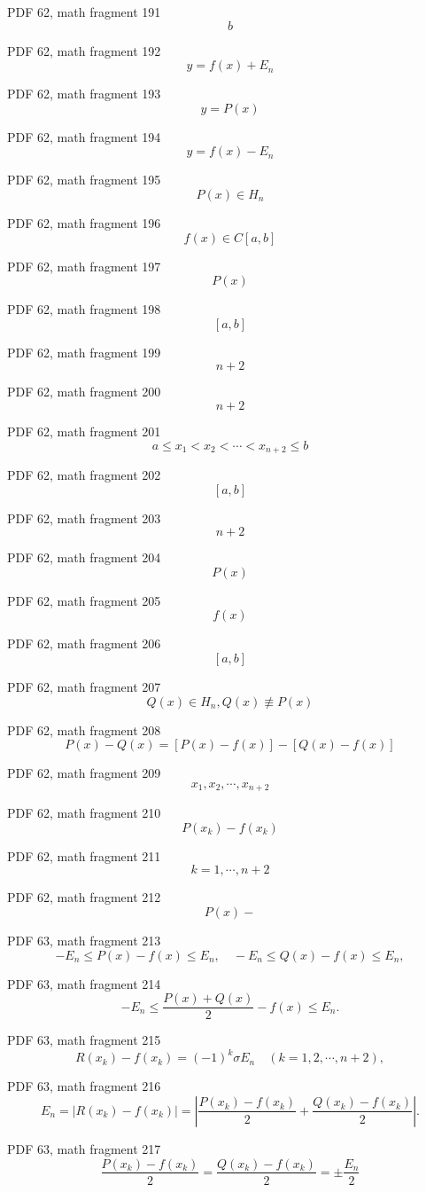 \documentclass[UTF8,fontset=fandol]{ctexart}
\begin{document}
PDF 62, math fragment 191
\[b\]
\par
PDF 62, math fragment 192
\[y=f(x)+E_n\]
\par
PDF 62, math fragment 193
\[y=P(x)\]
\par
PDF 62, math fragment 194
\[y=f(x)-E_n\]
\par
PDF 62, math fragment 195
\[P(x) \in H_n\]
\par
PDF 62, math fragment 196
\[f(x) \in C[a,b]\]
\par
PDF 62, math fragment 197
\[P(x)\]
\par
PDF 62, math fragment 198
\[[a,b]\]
\par
PDF 62, math fragment 199
\[n+2\]
\par
PDF 62, math fragment 200
\[n+2\]
\par
PDF 62, math fragment 201
\[a \leqslant x_1 < x_2 < \cdots < x_{n+2} \leqslant b\]
\par
PDF 62, math fragment 202
\[[a,b]\]
\par
PDF 62, math fragment 203
\[n+2\]
\par
PDF 62, math fragment 204
\[P(x)\]
\par
PDF 62, math fragment 205
\[f(x)\]
\par
PDF 62, math fragment 206
\[[a,b]\]
\par
PDF 62, math fragment 207
\[Q(x) \in H_n, Q(x) \not\equiv P(x)\]
\par
PDF 62, math fragment 208
\[P(x) - Q(x) = [P(x) - f(x)] - [Q(x) - f(x)]\]
\par
PDF 62, math fragment 209
\[x_1, x_2, \cdots, x_{n+2}\]
\par
PDF 62, math fragment 210
\[P(x_k) - f(x_k)\]
\par
PDF 62, math fragment 211
\[k=1, \cdots, n+2\]
\par
PDF 62, math fragment 212
\[P(x) -\]
\par
PDF 63, math fragment 213
\[
-E_n \leqslant P(x)-f(x) \leqslant E_n, \quad -E_n \leqslant Q(x)-f(x) \leqslant E_n,
\]
\par
PDF 63, math fragment 214
\[
-E_n \leqslant \frac{P(x)+Q(x)}{2}-f(x) \leqslant E_n.
\]
\par
PDF 63, math fragment 215
\[
R(x_k)-f(x_k)=(-1)^k \sigma E_n \quad (k=1,2,\cdots,n+2),
\]
\par
PDF 63, math fragment 216
\[
E_n=\left|R(x_k)-f(x_k)\right|=\left|\frac{P(x_k)-f(x_k)}{2}+\frac{Q(x_k)-f(x_k)}{2}\right|. \tag{3.2.5}
\]
\par
PDF 63, math fragment 217
\[
\frac{P(x_k)-f(x_k)}{2}=\frac{Q(x_k)-f(x_k)}{2}=\pm \frac{E_n}{2}
\]
\end{document}
